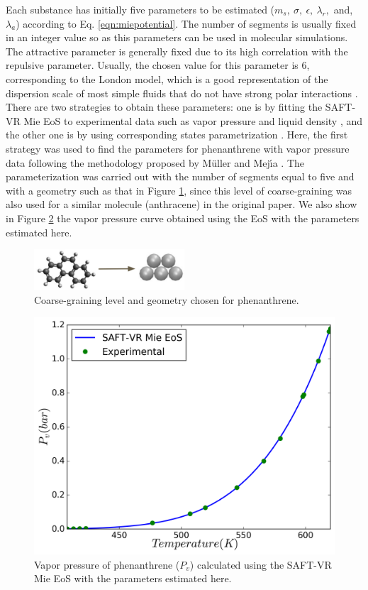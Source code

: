 \documentclass[final,12p,times,twocolumn]{elsarticle}
\begin{document}
	Each substance has initially five parameters to be estimated ($m_s,\ \sigma,\ \epsilon,\ \lambda_{r},$ and, $ \lambda_{a}$) according to Eq. \ref{eqn:miepotential}. The number of segments is usually fixed in an integer value so as this parameters can be used in molecular simulations. The attractive parameter is generally fixed due to its high correlation with the repulsive parameter. Usually, the chosen value for this parameter is 6, corresponding to the London model, which is a good representation of the dispersion scale of most simple fluids that do not have strong polar interactions \cite{ramrattan2015,herdes2015}.  There are two strategies to obtain these parameters: one is by fitting the SAFT-VR Mie EoS to experimental data such as vapor pressure and liquid density \cite{avendano2013}, and the other one is by using corresponding states parametrization \cite{mejia2014}. Here, the first strategy was used to find the parameters for phenanthrene with vapor pressure data \cite{murphy,osborn} following the methodology proposed by M\"{u}ller and Mej\'{\i}a \cite{muller2017}.  The parameterization was carried out with the number of segments equal to five and with a geometry such as that in Figure \ref{fig:fen5}, since this level of coarse-graining was also used for a similar molecule (anthracene) in the original paper. We also show in Figure \ref{fig:edefit} the vapor pressure curve obtained using the EoS with the parameters estimated here.
	
	\begin{figure}[th]
		\centering
		\includegraphics[width=0.50\textwidth]{Figures/fe5cg}
		\caption{Coarse-graining level and geometry chosen for phenanthrene.}
		\label{fig:fen5}
	\end{figure}
	
	\begin{figure}[h]
		\raggedleft
		\includegraphics[width=1.0\linewidth]{Figures/eos}
		\caption{Vapor pressure of phenanthrene ($P_{v}$) calculated using the SAFT-VR Mie EoS with the parameters estimated here.}
		\label{fig:edefit}
	\end{figure}
	
\end{document}
